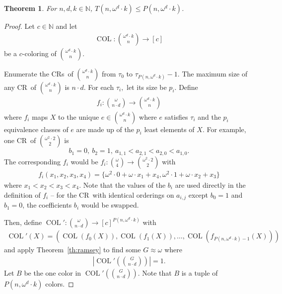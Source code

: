 \documentclass[11pt]{article}
\newcommand{\om}{\omega}
\newcommand{\oequiv}{\approx}
\newcommand{\COL}{\operatorname{COL}}
\newcommand{\N}{\mathbb{N}}
\newcommand{\crulenospace}{CR}
\newcommand{\crule}{\crulenospace~}
\newcommand{\crules}{\crulenospace s~}
\newcommand{\numpoints}{n}
\newcommand{\inumpoints}{i}
\newcommand{\idegr}{j}
\newcommand{\numcolors}{c}
\newcommand{\commonconst}{a}
\newcommand{\rareconst}{b}
\newcommand{\Rareconst}{B}
\theoremstyle{plain}
\newtheorem{theorem}{Theorem}[section]
\theoremstyle{definition}
\begin{document}
\begin{theorem}\label{th:wdk-LT}
For $\numpoints,d,k \in \N$, $T\left(\numpoints, \om^d \cdot k\right) \leq P\left(\numpoints, \om^d \cdot k\right)$.
\end{theorem} 

\begin{proof}
Let $\numcolors \in \N$ and let \begin{align*}
    \COL \colon \binom{\om^d\cdot k}{\numpoints} \to [\numcolors]
\end{align*}
be a $\numcolors$-coloring of $\binom{\om^d\cdot k}{\numpoints}$.

Enumerate the \crules of $\binom{\om^d\cdot k}{\numpoints}$ from $\tau_0$ to $\tau_{P(\numpoints, \om^d \cdot k)}-1$. The maximum size of any \crule of $\binom{\om^d\cdot k}{\numpoints}$ is $\numpoints \cdot d$. For each $\tau_i,$ let its size be $p_i$. Define \begin{align*}
    f_i \colon \binom{\om}{\numpoints \cdot d} \to \binom{\om^d\cdot k}{\numpoints}
\end{align*}
where $f_i$ maps $X$ to the unique $e \in \binom{\om^d\cdot k}{\numpoints}$
where $e$ satisfies $\tau_i$ and the $p_i$ equivalence classes of $e$ are made up of the $p_i$ least elements of $X$. For example, one \crule of $\binom{\om^2\cdot 2}{2}$ is $$
\rareconst_1=0,~\rareconst_2=1,~\commonconst_{1, 1} < \commonconst_{2, 1} < \commonconst_{2, 0} < \commonconst_{1, 0}.
$$ The corresponding $f_i$ would be $f_i \colon \binom{\om}{4} \to \binom{\om^2\cdot 2}{2}$ with \begin{align*}
f_i(x_1,x_2,x_3,x_4) = \{\om^2 \cdot 0 + \om \cdot x_1 + x_4, \om^2 \cdot 1 + \om \cdot x_2 + x_3\}
\end{align*} where $x_1 < x_2 < x_3 < x_4$. Note that the values of the $\rareconst_{\inumpoints}$ are used directly in the definition of $f_i$ -- for the \crule with identical orderings on $\commonconst_{\inumpoints,\idegr}$ except $\rareconst_0=1$ and $\rareconst_1=0$, the coefficients $\rareconst_{\inumpoints}$ would be swapped.

Then, define $\COL' \colon \binom{\om}{\numpoints \cdot d} \to [\numcolors]^{P(\numpoints,\om^d \cdot k)}$ with \begin{align*}
    \COL'(X) = (\COL(f_0(X)),\COL(f_1(X)),\ldots,\COL(f_{P(\numpoints, \om^d \cdot k)-1}(X)))
\end{align*}
and apply Theorem~\ref{th:ramsey} to find some $G \oequiv \om$ where \begin{align*}
\left |    \COL' \left( \binom{G}{\numpoints \cdot d} \right)\right |=1.
\end{align*}
Let $\Rareconst$ be the one color in $\COL'\left(\binom{G}{\numpoints\cdot d}\right)$.
Note that $\Rareconst$ is a tuple of $P(\numpoints, \om^d \cdot k)$ colors.


\end{proof}
\end{document}
